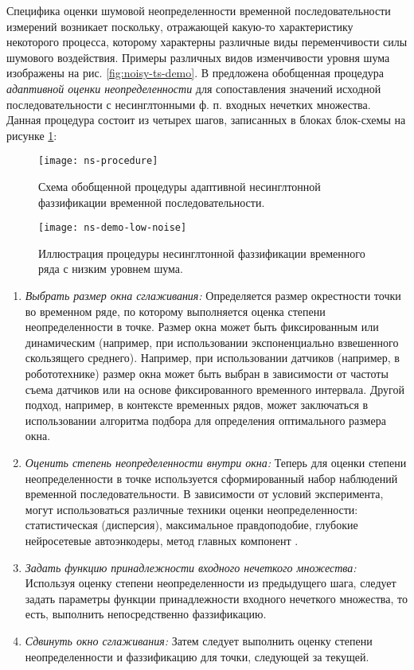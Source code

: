 Специфика оценки шумовой неопределенности временной последовательности измерений возникает поскольку, отражающей какую-то характеристику некоторого процесса, которому характерны различные виды переменчивости силы шумового воздействия. Примеры различных видов изменчивости уровня шума изображены на рис. \cref{fig:noisy-ts-demo}. В \cite{Pekaslan2020} предложена обобщенная процедура \textit{адаптивной оценки неопределенности} для сопоставления значений исходной последовательности с несинглтонными ф. п. входных нечетких множества. Данная процедура состоит из четырех шагов, записанных в блоках блок-схемы на рисунке \cref{fig:ns-procedure}:

\begin{figure}[h]
	\centering
	\texttt{[image: ns-procedure]}
	\caption{Схема обобщенной процедуры адаптивной несинглтонной фаззификации временной последовательности.}
	\label{fig:ns-procedure}
\end{figure}

\begin{figure}[thb]
\centering
\texttt{[image: ns-demo-low-noise]}
\caption{Иллюстрация процедуры несинглтонной фаззификации временного ряда с низким уровнем шума.}
\label{fig:ns-demo-low-noise}
\end{figure}

\begin{enumerate}
	\item \textit{Выбрать размер окна сглаживания:} Определяется размер окрестности точки во временном ряде, по которому выполняется оценка степени неопределенности в точке. Размер окна может быть фиксированным или динамическим (например, при использовании экспоненциально взвешенного скользящего среднего). Например, при использовании датчиков (например, в робототехнике)	размер окна может быть выбран в зависимости от частоты съема датчиков или на основе фиксированного временного интервала. Другой подход, например, в контексте	временных рядов, может заключаться в использовании алгоритма подбора для определения оптимального размера окна.
	\item \textit{Оценить степень неопределенности внутри окна:} Теперь для оценки степени неопределенности в точке используется сформированный набор наблюдений временной последовательности. В зависимости от условий эксперимента, могут использоваться различные техники оценки неопределенности: статистическая (дисперсия), максимальное правдоподобие, глубокие нейросетевые автоэнкодеры, метод главных компонент . 
	\item \textit{Задать функцию принадлежности входного нечеткого множества:} Используя оценку степени неопределенности из предыдущего шага, следует задать параметры функции принадлежности входного нечеткого множества, то есть, выполнить непосредственно фаззификацию.
	\item \textit{Сдвинуть окно сглаживания:} Затем следует выполнить оценку степени неопределенности и фаззификацию для точки, следующей за текущей.
\end{enumerate}

